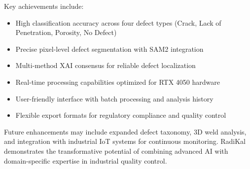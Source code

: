 \documentclass[12pt,a4paper]{report}
\begin{document}
Key achievements include:
\begin{itemize}
    \item High classification accuracy across four defect types (Crack, Lack of Penetration, Porosity, No Defect)
    \item Precise pixel-level defect segmentation with SAM2 integration
    \item Multi-method XAI consensus for reliable defect localization
    \item Real-time processing capabilities optimized for RTX 4050 hardware
    \item User-friendly interface with batch processing and analysis history
    \item Flexible export formats for regulatory compliance and quality control
\end{itemize}

Future enhancements may include expanded defect taxonomy, 3D weld analysis, and integration with industrial IoT systems for continuous monitoring. RadiKal demonstrates the transformative potential of combining advanced AI with domain-specific expertise in industrial quality control.

\clearpage
\nocite{*}  %


\end{document}
